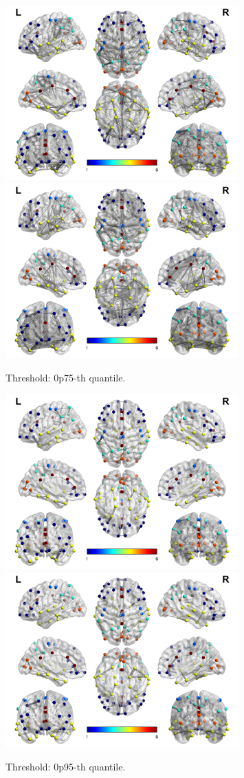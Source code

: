 \documentclass[12pt]{article}
\begin{document}
\begin{figure}
\centering
\includegraphics[width=0.8\textwidth]{correlations_early_0p75.png}
\includegraphics[width=0.8\textwidth]{correlations_late_0p75.png}
\caption{Threshold: 0p75-th quantile.}
\end{figure}


\begin{figure}
\centering
\includegraphics[width=0.8\textwidth]{correlations_early_0p95.png}
\includegraphics[width=0.8\textwidth]{correlations_late_0p95.png}
\caption{Threshold: 0p95-th quantile.}
\end{figure}
\end{document}
